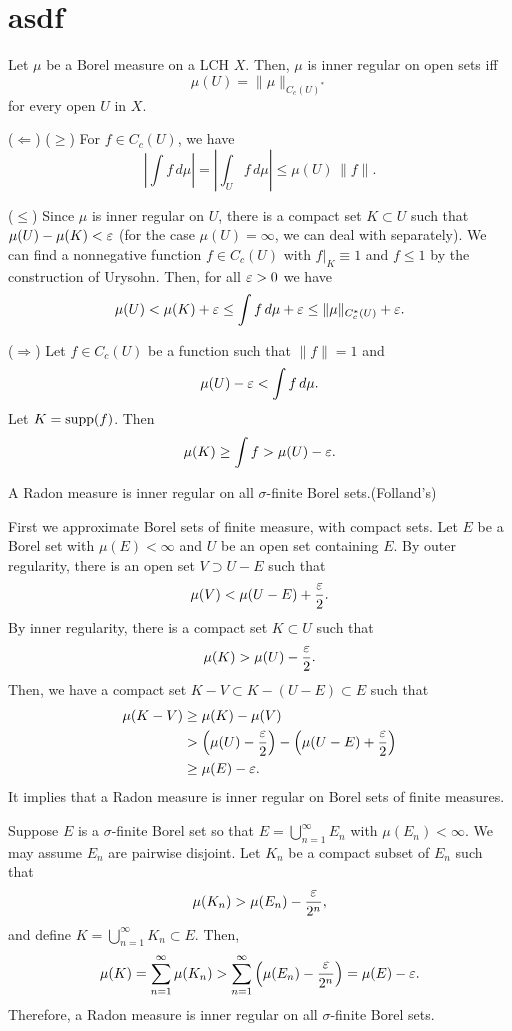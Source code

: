\documentclass{../note}
\begin{document}

\section*{asdf}


\begin{lem}
Let $\mu$ be a Borel measure on a LCH $X$.
Then, $\mu$ is inner regular on open sets iff
\[\mu(U)=\|\mu\|_{C_c(U)^*}\]
for every open $U$ in $X$.
\end{lem}
\begin{pf}
($\Leftarrow$)
($\ge$)
For $f\in C_c(U)$, we have
\[|\int f\,d\mu|=|\int_Uf\,d\mu|\le\mu(U)\,\|f\|.\]

($\le$)
Since $\mu$ is inner regular on $U$, there is a compact set $K\subset U$ such that $\mu(U)-\mu(K)<\varepsilon$ (for the case $\mu(U)=\infty$, we can deal with separately).
We can find a nonnegative function $f\in C_c(U)$ with $f|_K \equiv 1$ and $f\le1$ by the construction of Urysohn.
Then, for all $\varepsilon>0$ we have
\[\mu(U)<\mu(K)+\varepsilon\le\int f\,d\mu+\varepsilon\le\|\mu\|_{C_c^*(U)}+\varepsilon.\]

($\Rightarrow$)
Let $f\in C_c(U)$ be a function such that $\|f\|=1$ and
\[\mu(U)-\varepsilon<\int f\,d\mu.\]
Let $K=\operatorname{supp}(f)$.
Then
\[\mu(K)\ge\int f>\mu(U)-\varepsilon.\]
\end{pf}

\begin{prop}
A Radon measure is inner regular on all $\sigma$-finite Borel sets.(Folland's)
\end{prop}
\begin{pf}
First we approximate Borel sets of finite measure, with compact sets.
Let $E$ be a Borel set with $\mu(E)<\infty$ and $U$ be an open set containing $E$.
By outer regularity, there is an open set $V\supset U-E$ such that
\[\mu(V)<\mu(U-E)+\frac{\varepsilon}2.\]
By inner regularity, there is a compact set $K\subset U$ such that
\[\mu(K)>\mu(U)-\frac{\varepsilon}2.\]
Then, we have a compact set $K-V\subset K-(U-E)\subset E$ such that
\begin{align*}
\mu(K-V)&\ge\mu(K)-\mu(V)\\
&>\left(\mu(U)-\frac{\varepsilon}2\right)-\left(\mu(U-E)+\frac{\varepsilon}2\right)\\
&\ge\mu(E)-\varepsilon.
\end{align*}
It implies that a Radon measure is inner regular on Borel sets of finite measures.

Suppose $E$ is a $\sigma$-finite Borel set so that $E=\bigcup_{n=1}^\infty E_n$ with $\mu(E_n)<\infty$.
We may assume $E_n$ are pairwise disjoint.
Let $K_n$ be a compact subset of $E_n$ such that
\[\mu(K_n)>\mu(E_n)-\frac{\varepsilon}{2^n},\]
and define $K=\bigcup_{n=1}^\infty K_n\subset E$.
Then,
\[\mu(K)=\sum_{n=1}^\infty\mu(K_n)>\sum_{n=1}^\infty\left(\mu(E_n)-\frac{\varepsilon}{2^n}\right)=\mu(E)-\varepsilon.\]
Therefore, a Radon measure is inner regular on all $\sigma$-finite Borel sets.
\end{pf}
\end{document}
